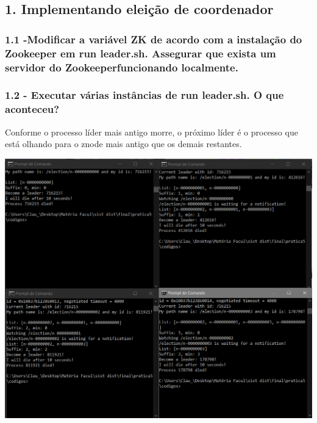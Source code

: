 \subsection*{1. Implementando eleição de coordenador}

\subsubsection{1.1 -Modificar a variável ZK de acordo com a instalação do Zookeeper em
run leader.sh. Assegurar que exista um servidor do Zookeeperfuncionando localmente.}

\vspace{-0.5em}
\begin{minipage}{\textwidth}
  \hspace{-1em}
  \centering
  
  \label{prog1}
  \hspace{1em}
\end{minipage}
\vspace{0.5em}

\subsubsection{1.2 - Executar várias instâncias de run leader.sh. O que aconteceu?}

Conforme o processo líder mais antigo morre, o próximo líder é o processo que está olhando para o znode mais antigo que os demais restantes. \newline

\begin{center}
\includegraphics[width=20cm]{pratica5/prints/roteiro 1.2.PNG}
\end{center}

